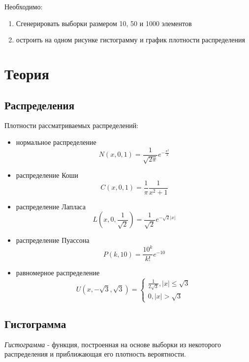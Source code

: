 ﻿\documentclass[12pt,a4paper]{article}
\begin{document}
Необходимо:
\begin{enumerate}
    \item Сгенерировать выборки размером 10, 50 и 1000 элементов
    \item остроить на одном рисунке гистограмму и график плотности распределения
\end{enumerate}

\section{Теория}
\subsection{Распределения}
Плотности рассматриваемых распределений:
\begin{itemize}
		\item нормальное распределение
		    \begin{equation}
			    N(x,0,1)=\frac{1}{\sqrt{2\pi}}e^{-\frac{x^2}{2}}
			    \label{normal} 
			\end{equation}
		\item распределение Коши
		    \begin{equation}
				C(x,0,1)=\frac{1}{\pi}\frac{1}{x^2+1}
				\label{cauchy}
			\end{equation} 
		\item распределение Лапласа
		    \begin{equation}
				L(x,0,\frac{1}{\sqrt{2}})=\frac{1}{\sqrt{2}}e^{-\sqrt{2}|x|}
				\label{laplace} 
			\end{equation}
		\item распределение Пуассона
		    \begin{equation}
				P(k,10)=\frac{10^k}{k!}e^{-10}
				\label{poisson}
			\end{equation}
		\item равномерное распределение
		    \begin{equation}
				U(x,-\sqrt{3},\sqrt{3})=
				\begin{cases}
					\frac{1}{2\sqrt{3}},|x|\leq\sqrt{3}\\0,|x|>\sqrt{3}
				\end{cases}
				\label{uniform}
			\end{equation}
\end{itemize}

\subsection{Гистограмма}
\textit{Гистограмма} - функция, построенная на основе выборки из некоторого распределения и приближающая его плотность вероятности.
\end{document}
